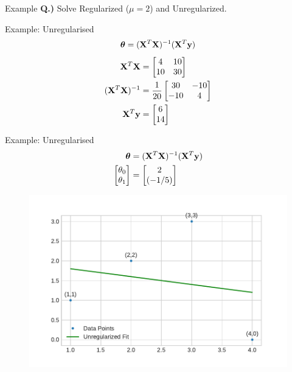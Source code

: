 \documentclass{beamer}
\begin{document}
\begin{frame}{Example}
\vspace{0.4cm}
\textbf{Q.)} Solve Regularized ($\mu = 2$) and Unregularized.
\vspace{-0.6cm}
\begin{figure}
\end{figure}
\end{frame}

\begin{frame}{Example: Unregularised}
\[
\boldsymbol{\theta} = (\mathbf{X}^{T}\mathbf{X})^{-1}(\mathbf{X}^{T}\mathbf{y})
\]
\pause
\begin{align*}
\mathbf{X}^{T}\mathbf{X} &= \begin{bmatrix}
4 &10\\10&30
\end{bmatrix} \\
(\mathbf{X}^{T}\mathbf{X})^{-1} &= \frac{1}{20} \begin{bmatrix}
30 & -10\\
-10& 4
\end{bmatrix}\\
\mathbf{X}^{T}\mathbf{y} &= \begin{bmatrix}
6\\
14
\end{bmatrix}
\end{align*}
\end{frame}


\begin{frame}{Example: Unregularised}
\vspace{0.4cm}
\begin{align*}
\begin{split}
\boldsymbol{\theta} &= (\mathbf{X}^{T}\mathbf{X})^{-1}(\mathbf{X}^{T}\mathbf{y})\\
\begin{bmatrix}
\theta_{0}\\
\theta_{1}
\end{bmatrix} &= 
\begin{bmatrix}
2\\
(-1/5)
\end{bmatrix} 
\end{split}
\end{align*}
\vspace{-0.8cm}
\begin{figure}
\includegraphics[width=0.8\linewidth]{../assets/ridge/figures/q_unreg.pdf}
\end{figure}
\end{frame}
\end{document}

